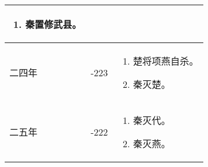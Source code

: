 \begin{longtable}{|>{\centering\scriptsize}m{2em}|>{\centering\scriptsize}m{1.3em}|>{\centering}m{9em}|}
\begin{enumerate}
  \item 秦置修武县。
  \end{enumerate} \tabularnewline\hline
  二四年 & -223 & \begin{enumerate}
    \tiny
  \item 楚将项燕自杀。
  \item 秦灭楚。
  \end{enumerate} \tabularnewline\hline
  二五年 & -222 & \begin{enumerate}
    \tiny
  \item 秦灭代。
  \item 秦灭燕。
  \end{enumerate} \tabularnewline
  \bottomrule
\end{longtable}

